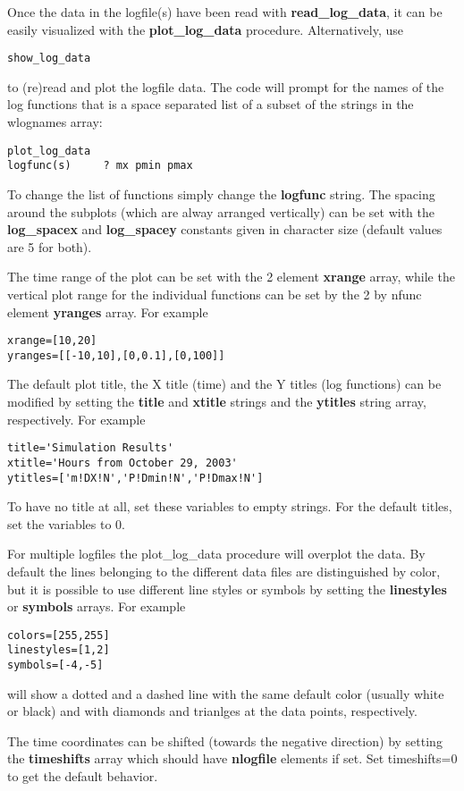 \documentclass{article}
\begin{document}
Once the data in the logfile(s) have been read with {\bf read\_log\_data},
it can be easily visualized with the {\bf plot\_log\_data} procedure.
Alternatively, use
\begin{verbatim}
show_log_data
\end{verbatim}
to (re)read and plot the logfile data. 
The code will prompt for the names of the log functions that is
a space separated list of a subset of the strings in the wlognames array:
\begin{verbatim}
plot_log_data
logfunc(s)     ? mx pmin pmax
\end{verbatim}
To change the list of functions simply change the {\bf logfunc} string.
The spacing around the subplots (which are alway arranged vertically)
can be set with the {\bf log\_spacex} and {\bf log\_spacey} constants
given in character size (default values are 5 for both).

The time range of the plot can be set with the 2 element
{\bf xrange} array, while the vertical plot range for the individual functions 
can be set by the 2 by nfunc element {\bf yranges} array. For example
\begin{verbatim}
xrange=[10,20]
yranges=[[-10,10],[0,0.1],[0,100]]
\end{verbatim}
The default plot title, the X title (time) and the Y titles (log functions)
can be modified by setting the {\bf title} and {\bf xtitle} strings
and the {\bf ytitles} string array, respectively. For example
\begin{verbatim}
title='Simulation Results'
xtitle='Hours from October 29, 2003'
ytitles=['m!DX!N','P!Dmin!N','P!Dmax!N']
\end{verbatim}
To have no title at all, set these variables to empty strings.
For the default titles, set the variables to 0.

For multiple logfiles the plot\_log\_data procedure will overplot the data.
By default the lines belonging to the different data files are distinguished
by color, but it is possible to use different line styles or symbols
by setting the {\bf linestyles} or {\bf symbols} arrays. For example
\begin{verbatim}
colors=[255,255]
linestyles=[1,2]
symbols=[-4,-5]
\end{verbatim}
will show a dotted and a dashed line with the same default color
(usually white or black) and with diamonds and trianlges at
the data points, respectively.

The time coordinates can be shifted 
(towards the negative direction) by setting the {\bf timeshifts}
array which should have {\bf nlogfile} elements if set.
Set timeshifts=0 to get the default behavior.
\end{document}
